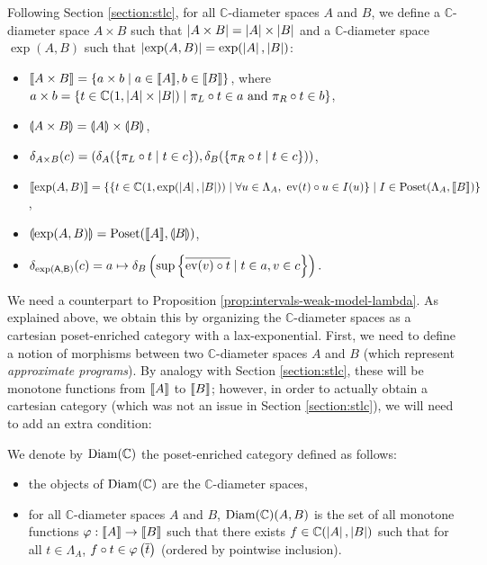 Following Section \ref{section:stlc}, for all $\mathbb{C}$-diameter spaces $A$ and $B$, we define a $\mathbb{C}$-diameter space $A \times B$ such that $\left\vert A \times B\right\vert = \left\vert A\right\vert \times \left\vert B\right\vert$ and a $\mathbb{C}$-diameter space $\exp(A,B)$ such that $\left\vert\exp(A,B)\right\vert = \exp(\left\vert A\right\vert,\left\vert B\right\vert)$: \begin{itemize}
\item $\llbracket A \times B \rrbracket = \{ a \times b \mid a \in \llbracket A \rrbracket, b \in \llbracket B \rrbracket \} $, where $a \times b = \{ t \in \mathbb{C}(1, \left\vert A\right\vert \times \left\vert B\right\vert) \mid \pi_L \circ t \in a \text{ and } \pi_R \circ t \in b \}$,
\item $\llparenthesis A \times B \rrparenthesis = \llparenthesis A \rrparenthesis \times \llparenthesis B \rrparenthesis$,
\item $\delta_{A \times B}(c) = (\delta_A(\{ \pi_L \circ t \mid t \in c \}), \delta_B(\{ \pi_R \circ t \mid t \in c \}))$,
\item $\llbracket \exp(A, B) \rrbracket = \{ \{ t \in \mathbb{C}(1, \exp(\left\vert A\right\vert, \left\vert B\right\vert)) \mid \forall u \in \Lambda_{A},~ \operatorname{ev}(t) \circ u \in I(u) \} \mid I\in \operatorname{Poset}(\Lambda_A, \llbracket B \rrbracket) \}$,
\item $\llparenthesis \exp(A, B) \rrparenthesis = \operatorname{Poset}(\llbracket A \rrbracket, \llparenthesis B \rrparenthesis)$,
\item $\delta_\mathsf{\exp(A, B)}(c) = a \mapsto \delta_B\left(\sup\left\{\overline{\operatorname{ev}(v) \circ t} \mid t\in a, v \in c\right\}\right).$
\end{itemize}

We need a counterpart to Proposition \ref{prop:intervals-weak-model-lambda}. As explained above, we obtain this by organizing the $\mathbb{C}$-diameter spaces as a cartesian poset-enriched category with a lax-exponential. First, we need to define a notion of morphisms between two $\mathbb{C}$-diameter spaces $A$ and $B$ (which represent \emph{approximate programs}). By analogy with Section \ref{section:stlc}, these will be monotone functions from $\llbracket A \rrbracket$ to $\llbracket B \rrbracket$; however, in order to actually obtain a cartesian category (which was not an issue in Section \ref{section:stlc}), we will need to add an extra condition:

\begin{definition}
We denote by $\operatorname{Diam}(\mathbb{C})$ the poset-enriched category defined as follows: \begin{itemize}
\item the objects of $\operatorname{Diam}(\mathbb{C})$ are the $\mathbb{C}$-diameter spaces,
\item for all $\mathbb{C}$-diameter spaces $A$ and $B$, $\operatorname{Diam}(\mathbb{C})(A,B)$ is the set of all monotone functions $\varphi : \llbracket A \rrbracket \to \llbracket B \rrbracket$ such that there exists $f \in \mathbb{C}(\left\vert A\right\vert,\left\vert B\right\vert)$ such that for all $t \in \Lambda_A$, $f \circ t \in \varphi\left(\overline{t}\right)$ (ordered by pointwise inclusion).
\end{itemize}
\end{definition}

